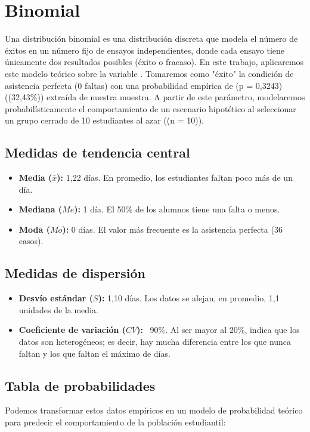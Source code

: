 \section{Binomial}
Una distribución binomial es una distribución discreta que modela el número de éxitos en un número
fijo de ensayos independientes, donde cada ensayo tiene únicamente dos resultados posibles (éxito
o fracaso). En este trabajo, aplicaremos este modelo teórico sobre la variable
. Tomaremos como "éxito" la condición de asistencia perfecta (0 faltas) con
una probabilidad empírica de (p = 0,3243) ((32,43\%)) extraída de nuestra muestra. A partir de este
parámetro, modelaremos probabilísticamente el comportamiento de un escenario hipotético al
seleccionar un grupo cerrado de 10 estudiantes al azar ((n = 10)).

\subsection{Medidas de tendencia central}
\begin{itemize}
	\item \textbf{Media ($\bar{x}$):} 1,22 días. En promedio, los estudiantes faltan poco más de un día.
	\item \textbf{Mediana ($Me$):} 1 día. El 50\% de los alumnos tiene una falta o menos.
	\item \textbf{Moda ($Mo$):} 0 días. El valor más frecuente es la asistencia perfecta (36 casos).
\end{itemize}

\subsection{Medidas de dispersión}
\begin{itemize}
	\item \textbf{Desvío estándar ($S$):} 1,10 días. Los datos se alejan, en promedio, 1,1 unidades de la media.
	\item \textbf{Coeficiente de variación ($CV$):} ~90\%. Al ser mayor al 20\%, indica que los datos son heterogéneos; es decir, hay mucha diferencia entre los que nunca faltan y los que faltan el máximo de días.
\end{itemize}

\subsection{Tabla de probabilidades}
Podemos transformar estos datos empíricos en un modelo de probabilidad teórico para predecir el
comportamiento de la población estudiantil:


